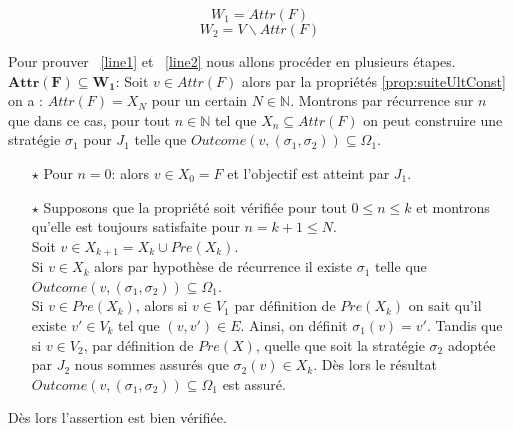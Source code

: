 	\begin{propriete}
		\label{prop:attracteur}
	\begin{equation}
		W_{1} = Attr(F) \label{line1}
	\end{equation}
	\begin{equation}
		W_{2} = V \backslash Attr(F) \label{line2}
	\end{equation}
		
	\end{propriete}
	\begin{demonstration}
		Pour prouver ~\eqref{line1} et ~\eqref{line2} nous allons procéder en plusieurs étapes.\\
		
		\noindent$\mathbf{Attr(F) \subseteq W_{1}}$: Soit $v \in Attr(F)$ alors par la propriétés \ref{prop:suiteUltConst} on a : $Attr(F) = X_{N}$ pour un certain $N \in \mathbb{N}$. Montrons par récurrence sur $n$ que dans ce cas, pour tout $n \in \mathbb{N}$ tel que $X_{n} \subseteq Attr(F)$ on peut construire une stratégie $\sigma _{1}$ pour $J_{1}$ telle que $Outcome(v,(\sigma _{1},\sigma _{2})) \subseteq \Omega _{1}$.
		\begin{enumerate}
			\item[$\star$] Pour $n=0$: alors $v \in X_{0} = F$ et l'objectif est atteint par $J_{1}$.
			\item[$\star$] Supposons que la propriété soit vérifiée pour tout $ 0 \leq n \leq k $ et montrons qu'elle est toujours satisfaite pour $n = k + 1 \leq N$. \\
			Soit $v \in X_{k+1} = X_{k} \cup Pre(X_{k})$. \\
			Si $v \in X_{k}$ alors par hypothèse de récurrence il existe $\sigma _{1}$ telle que $Outcome(v,(\sigma _{1},\sigma _{2})) \subseteq \Omega _{1}$.\\
			Si $v \in Pre(X_{k})$, alors si $v \in V_{1}$ par définition de $Pre(X_{k})$ on sait qu'il existe $v'\in V_{k}$ tel que $(v,v')\in E$. Ainsi, on définit $\sigma _{1}(v) = v'$. Tandis que si $v \in V_{2}$, par définition de $Pre(X)$, quelle que soit la stratégie $\sigma _{2}$ adoptée par $J_{2}$  nous sommes assurés que $\sigma _{2}(v) \in X_{k}$. Dès lors le résultat $Outcome(v,(\sigma _{1},\sigma _{2})) \subseteq \Omega _{1}$ est assuré.
		\end{enumerate}
		Dès lors l'assertion est bien vérifiée.\\
		

\end{demonstration}
